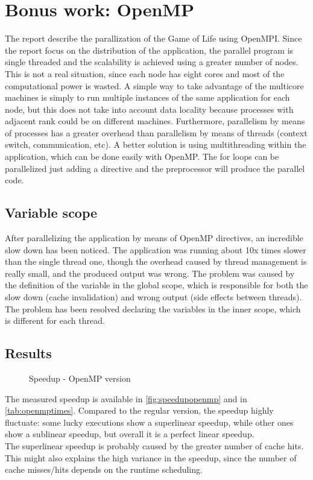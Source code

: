 \documentclass{article}
\begin{document}
\appendix

\section{Bonus work: OpenMP}
The report describe the parallization of the Game of Life using OpenMPI. Since the report focus on the distribution of the application, the parallel program is single threaded and the scalability is achieved using a greater number of nodes. This is not a real situation, since each node has eight cores and most of the computational power is wasted. A simple way to take advantage of the multicore machines is simply to run multiple instances of the same application for each node, but this does not take into account data locality because processes with adjacent rank could be on different machines. Furthermore, parallelism by means of processes has a greater overhead than parallelism by means of threads (context switch, communication, etc). A better solution is using multithreading within the application, which can be done easily with OpenMP. The for loops can be parallelized just adding a directive and the preprocessor will produce the parallel code.

\subsection{Variable scope}
After parallelizing the application by means of OpenMP directives, an incredible slow down has been noticed. The application was running about 10x times slower than the single thread one, though the overhead caused by thread management is really small, and the produced output was wrong. The problem was caused by the definition of the variable in the global scope, which is responsible for both the slow down (cache invalidation) and wrong output (side effects between threads). The problem has been resolved declaring the variables in the inner scope, which is different for each thread.

\subsection{Results}
\begin{figure}
\centering
{}
\caption{Speedup - OpenMP version}
\label{fig:speedupopenmp}
\end{figure}

The measured speedup is available in \autoref{fig:speedupopenmp} and in \autoref{tab:openmptimes}. Compared to the regular version, the speedup highly fluctuate: some lucky executions show a superlinear speedup, while other ones show a sublinear speedup, but overall it is a perfect linear speedup. \\
The superlinear speedup is probably caused by the greater number of cache hits. This might also explains the high variance in the speedup, since the number of cache misses/hits depends on the runtime scheduling.
\end{document}
